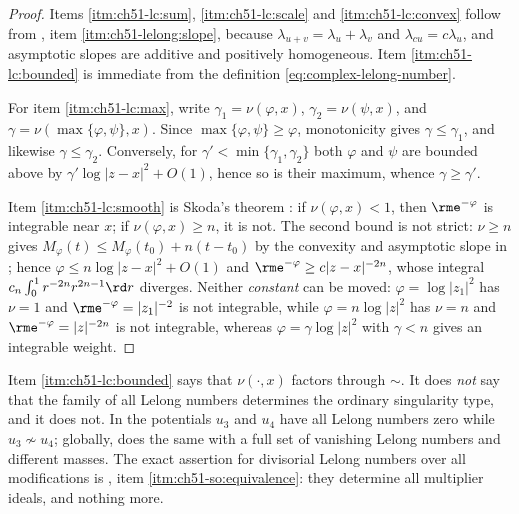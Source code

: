 \begin{proof}
Items \cref{itm:ch51-lc:sum}, \cref{itm:ch51-lc:scale} and
\cref{itm:ch51-lc:convex} follow from
, item \cref{itm:ch51-lelong:slope}, because
$\lambda_{u+v}=\lambda_u+\lambda_v$ and
$\lambda_{cu}=c\lambda_u$, and asymptotic slopes are additive and
positively homogeneous.  Item \cref{itm:ch51-lc:bounded} is immediate from
the definition \eqref{eq:complex-lelong-number}.

For item \cref{itm:ch51-lc:max}, write $\gamma_1=\nu(\varphi,x)$,
$\gamma_2=\nu(\psi,x)$, and $\gamma=\nu(\max\{\varphi,\psi\},x)$.
Since $\max\{\varphi,\psi\}\geq\varphi$, monotonicity gives
$\gamma\leq\gamma_1$, and likewise $\gamma\leq\gamma_2$.  Conversely,
for $\gamma'<\min\{\gamma_1,\gamma_2\}$ both $\varphi$ and $\psi$
are bounded above by $\gamma'\log|z-x|^2+O(1)$, hence so is their
maximum, whence $\gamma\geq\gamma'$.

Item \cref{itm:ch51-lc:smooth} is Skoda's theorem \cite{Sko72}: if
$\nu(\varphi,x)<1$, then $\rme^{-\varphi}$ is integrable near $x$;
if $\nu(\varphi,x)\geq n$, it is not.  The second bound is not strict:
$\nu\geq n$ gives $M_\varphi(t)\leq M_\varphi(t_0)+n(t-t_0)$
by the convexity and asymptotic slope in
; hence
$\varphi\leq n\log|z-x|^2+O(1)$ and
$\rme^{-\varphi}\geq c|z-x|^{-2n}$, whose integral
$c_n\int_0^1r^{-2n}r^{2n-1}\rd r$ diverges.  Neither \emph{constant} can
be moved: $\varphi=\log|z_1|^2$ has $\nu=1$ and
$\rme^{-\varphi}=|z_1|^{-2}$ is not integrable, while
$\varphi=n\log|z|^2$ has $\nu=n$ and $\rme^{-\varphi}=|z|^{-2n}$ is
not integrable, whereas $\varphi=\gamma\log|z|^2$ with $\gamma<n$ gives
an integrable weight.
\end{proof}

\begin{remark}
\label{rem:ch51-lelong-not-faithful}
Item \cref{itm:ch51-lc:bounded} says that $\nu(\cdot,x)$ factors through
$\sim$.  It does \emph{not} say that the family of all Lelong numbers
determines the ordinary singularity type, and it does not.  In
 the potentials $u_3$ and $u_4$ have
all Lelong numbers zero while $u_3\not\sim u_4$; globally,
 does the same with a full set of vanishing Lelong
numbers and different masses.  The exact assertion for divisorial Lelong numbers over all
modifications is , item
\cref{itm:ch51-so:equivalence}: they determine all multiplier ideals, and
nothing more.
\end{remark}

